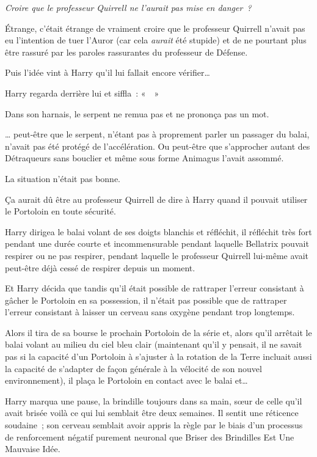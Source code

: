 \emph{Croire que le professeur Quirrell ne l'aurait pas mise en danger~?}

Étrange, c'était étrange de vraiment croire que le professeur Quirrell n'avait pas eu l'intention de tuer l'Auror (car cela \emph{aurait} été stupide) et de ne pourtant plus être rassuré par les paroles rassurantes du professeur de Défense.

Puis l'idée vint à Harry qu'il lui fallait encore vérifier…

Harry regarda derrière lui et siffla~: «~~»

Dans son harnais, le serpent ne remua pas et ne prononça pas un mot.

… peut-être que le serpent, n'étant pas à proprement parler un passager du balai, n'avait pas été protégé de l'accélération.
Ou peut-être que s'approcher autant des Détraqueurs sans bouclier et même sous forme Animagus l'avait assommé.

La situation n'était pas bonne.

Ça aurait dû être au professeur Quirrell de dire à Harry quand il pouvait utiliser le Portoloin en toute sécurité.

Harry dirigea le balai volant de ses doigts blanchis et réfléchit, il réfléchit très fort pendant une durée courte et incommensurable pendant laquelle Bellatrix pouvait respirer ou ne pas respirer, pendant laquelle le professeur Quirrell lui-même avait peut-être déjà cessé de respirer depuis un moment.

Et Harry décida que tandis qu'il était possible de rattraper l'erreur consistant à gâcher le Portoloin en sa possession, il n'était pas possible que de rattraper l'erreur consistant à laisser un cerveau sans oxygène pendant trop longtemps.

Alors il tira de sa bourse le prochain Portoloin de la série et, alors qu'il arrêtait le balai volant au milieu du ciel bleu clair (maintenant qu'il y pensait, il ne savait pas si la capacité d'un Portoloin à s'ajuster à la rotation de la Terre incluait aussi la capacité de s'adapter de façon générale à la vélocité de son nouvel environnement), il plaça le Portoloin en contact avec le balai et…

Harry marqua une pause, la brindille toujours dans sa main, sœur de celle qu'il avait brisée voilà ce qui lui semblait être deux semaines.
Il sentit une réticence soudaine~; son cerveau semblait avoir appris la règle par le biais d'un processus de renforcement négatif purement neuronal que Briser des Brindilles Est Une Mauvaise Idée.

